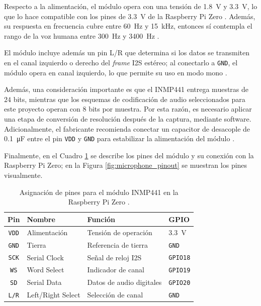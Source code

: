 Respecto a la alimentación, el módulo opera con una tensión de \SI{1.8}{\volt} y \SI{3.3}{\volt}, lo que lo hace compatible con los pines de \SI{3.3}{\volt} de la Raspberry Pi Zero \cite{inmp441_datasheet}.
Además, su respuesta en frecuencia cubre entre \SI{60}{\hertz} y \SI{15}{\kilo\hertz}, entonces sí contempla el rango de la voz humana entre \SI{300}{\hertz} y \SI{3400}{\hertz} \cite{inmp441_datasheet, tanenbaum2011}.

El módulo incluye además un pin L/R que determina si los datos se transmiten en el canal izquierdo o derecho del \textit{frame} I2S estéreo; al conectarlo a \texttt{GND}, el módulo opera en canal izquierdo, lo que permite su uso en modo mono \cite{inmp441_datasheet}.

Además, una consideración importante es que el INMP441 entrega muestras de $24$ bits, mientras que los esquemas de codificación de audio seleccionados para este proyecto operan con $8$ bits por muestra.
Por esta razón, es necesario aplicar una etapa de conversión de resolución después de la captura, mediante software.
Adicionalmente, el fabricante recomienda conectar un capacitor de desacople de \SI{0.1}{\micro\farad} entre el pin \texttt{VDD} y \texttt{GND} para estabilizar la alimentación del módulo \cite{inmp441_datasheet}.

Finalmente, en el Cuadro \ref{tab:inmp441_pines} se describe los pines del módulo y su conexión con la Raspberry Pi Zero; en la Figura \ref{fig:microphone_pinout} se muestran los pines visualmente.

\begin{table}[htb]
    \centering
    \caption{Asignación de pines para el módulo INMP441 en la Raspberry Pi Zero \cite{inmp441_datasheet}.}
    \label{tab:inmp441_pines}
    \begin{tabular}{@{}clp{3cm}l@{}}
        \toprule
        Pin  & Nombre & Función & GPIO \\
        \midrule
        \texttt{VDD}  & Alimentación       & Tensión de operación      & \SI{3.3}{\volt} \\
        \texttt{GND}  & Tierra             & Referencia de tierra      & \texttt{GND} \\
        \texttt{SCK}  & Serial Clock       & Señal de reloj I2S        & \texttt{GPIO18} \\
        \texttt{WS}   & Word Select        & Indicador de canal        & \texttt{GPIO19} \\
        \texttt{SD}   & Serial Data        & Datos de audio digitales  & \texttt{GPIO20} \\
        \texttt{L/R}  & Left/Right Select  & Selección de canal        & \texttt{GND} \\
        \bottomrule
    \end{tabular}
\end{table}

